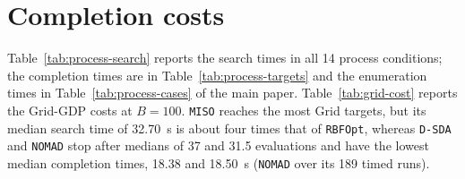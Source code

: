 \section{Completion costs}\label{sec:supp-uncertainty}

Table~\ref{tab:process-search} reports the search times in all 14 process conditions; the completion times are in Table~\ifdefined\manuscriptwithsupplement\ref{tab:process-targets}\fi{} and the enumeration times in Table~\ifdefined\manuscriptwithsupplement\ref{tab:process-cases}\fi{} of the main paper.
Table~\ref{tab:grid-cost} reports the Grid-GDP costs at \(B=100\).
\texttt{MISO} reaches the most Grid targets, but its median search time of 32.70~s is about four times that of \texttt{RBFOpt}, whereas \texttt{D-SDA} and \texttt{NOMAD} stop after medians of 37 and 31.5 evaluations and have the lowest median completion times, 18.38 and 18.50~s (\texttt{NOMAD} over its 189 timed runs).
